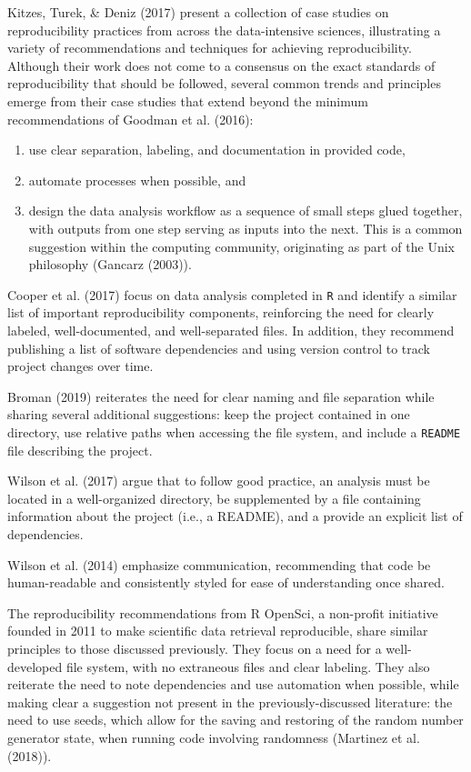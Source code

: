 \documentclass[12pt,twoside]{reedthesis}
\providecommand{\tightlist}{%
  \setlength{\itemsep}{0pt}\setlength{\parskip}{0pt}}
\begin{document}
Kitzes, Turek, \& Deniz (2017) present a collection of case studies on
reproducibility practices from across the data-intensive sciences,
illustrating a variety of recommendations and techniques for achieving
reproducibility. Although their work does not come to a consensus on the
exact standards of reproducibility that should be followed, several
common trends and principles emerge from their case studies that extend
beyond the minimum recommendations of Goodman et al. (2016):
\begin{enumerate}
\def\labelenumi{\arabic{enumi})}
\tightlist
\item
  use clear separation, labeling, and documentation in provided code,
\item
  automate processes when possible, and
\item
  design the data analysis workflow as a sequence of small steps glued
  together, with outputs from one step serving as inputs into the next.
  This is a common suggestion within the computing community,
  originating as part of the Unix philosophy (Gancarz (2003)).
\end{enumerate}
Cooper et al. (2017) focus on data analysis completed in \texttt{R} and
identify a similar list of important reproducibility components,
reinforcing the need for clearly labeled, well-documented, and
well-separated files. In addition, they recommend publishing a list of
software dependencies and using version control to track project changes
over time.

Broman (2019) reiterates the need for clear naming and file separation
while sharing several additional suggestions: keep the project contained
in one directory, use relative paths when accessing the file system, and
include a \texttt{README} file describing the project.

Wilson et al. (2017) argue that to follow good practice, an analysis
must be located in a well-organized directory, be supplemented by a file
containing information about the project (i.e., a README), and a provide
an explicit list of dependencies.

Wilson et al. (2014) emphasize communication, recommending that code be
human-readable and consistently styled for ease of understanding once
shared.

The reproducibility recommendations from R OpenSci, a non-profit
initiative founded in 2011 to make scientific data retrieval
reproducible, share similar principles to those discussed previously.
They focus on a need for a well-developed file system, with no
extraneous files and clear labeling. They also reiterate the need to
note dependencies and use automation when possible, while making clear a
suggestion not present in the previously-discussed literature: the need
to use seeds, which allow for the saving and restoring of the random
number generator state, when running code involving randomness (Martinez
et al. (2018)).
\end{document}
